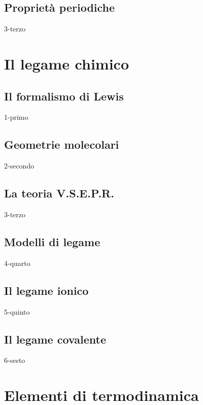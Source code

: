 \documentclass[openany,12pt]{book}%
\begin{document}
    \newpage

  \section{Proprietà periodiche}
    {3-terzo}

\chapter{Il legame chimico}

  \section{Il formalismo di Lewis}
    {1-primo}

    \newpage

  \section{Geometrie molecolari}
    {2-secondo}

    \newpage

  \section{La teoria V.S.E.P.R.}
    {3-terzo}

    \newpage

  \section{Modelli di legame}
    {4-quarto}

    \newpage

  \section{Il legame ionico}
    {5-quinto}

    \newpage

  \section{Il legame covalente}
    {6-sesto}

\chapter{Elementi di termodinamica}
\end{document}
